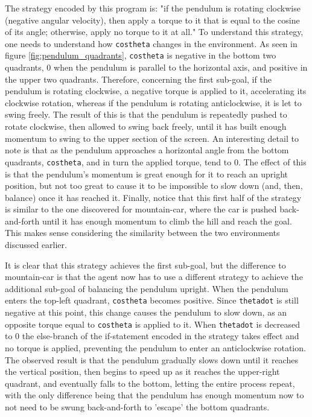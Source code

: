 The strategy encoded by this program is: "if the pendulum is rotating clockwise (negative angular velocity), then apply a torque to it that is equal to the cosine of its angle; otherwise, apply no torque to it at all." To understand this strategy, one needs to understand how \verb+costheta+ changes in the environment. As seen in figure \ref{fig:pendulum_quadrants}, \verb+costheta+ is negative in the bottom two quadrants, $0$ when the pendulum is parallel to the horizontal axis, and positive in the upper two quadrants. Therefore, concerning the first sub-goal, if the pendulum is rotating clockwise, a negative torque is applied to it, accelerating its clockwise rotation, whereas if the pendulum is rotating anticlockwise, it is let to swing freely. The result of this is that the pendulum is repeatedly pushed to rotate clockwise, then allowed to swing back freely, until it has built enough momentum to swing to the upper section of the screen. An interesting detail to note is that as the pendulum approaches a horizontal angle from the bottom quadrants, \verb+costheta+, and in turn the applied torque, tend to $0$. The effect of this is that the pendulum's momentum is great enough for it to reach an upright position, but not too great to cause it to be impossible to slow down (and, then, balance) once it has reached it. Finally, notice that this first half of the strategy is similar to the one discovered for mountain-car, where the car is pushed back-and-forth until it has enough momentum to climb the hill and reach the goal. This makes sense considering the similarity between the two environments discussed earlier.

It is clear that this strategy achieves the first sub-goal, but the difference to mountain-car is that the agent now has to use a different strategy to achieve the additional sub-goal of balancing the pendulum upright. When the pendulum enters the top-left quadrant, \verb+costheta+ becomes positive. Since \verb+thetadot+ is still negative at this point, this change causes the pendulum to slow down, as an opposite torque equal to \verb+costheta+ is applied to it. When \verb+thetadot+ is decreased to $0$ the else-branch of the if-statement encoded in the strategy takes effect and no torque is applied, preventing the pendulum to enter an anticlockwise rotation. The observed result is that the pendulum gradually slows down until it reaches the vertical position, then begins to speed up as it reaches the upper-right quadrant, and eventually falls to the bottom, letting the entire process repeat, with the only difference being that the pendulum has enough momentum now to not need to be swung back-and-forth to 'escape' the bottom quadrants.

